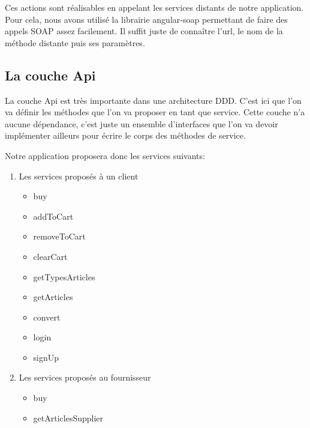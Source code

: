 \documentclass[a4paper]{article}
\begin{document}
    \bigskip
    
    Ces actions sont réalisables en appelant les services distants de notre application. Pour cela, nous avons utilisé la librairie angular-soap permettant de faire des appels SOAP assez facilement. Il suffit juste de connaître l'url, le nom de la méthode distante puis ses paramètres.
    
\subsection{La couche Api}
    La couche Api est très importante dans une architecture DDD. C'est ici que l'on va définir les méthodes que l'on va proposer en tant que service. Cette couche n'a aucune dépendance, c'est juste un ensemble d'interfaces que l'on va devoir implémenter ailleurs pour écrire le corps des méthodes de service.
    
    \bigskip
    
    Notre application proposera donc les services suivants:
    
    \bigskip
    
    \begin{enumerate}
        \item Les services proposés à un client
        \begin{itemize}
            \item buy
            \item addToCart
            \item removeToCart
            \item clearCart
            \item getTypesArticles
            \item getArticles
            \item convert
            \item login
            \item signUp
        \end{itemize}
        
        \item Les services proposés au fournisseur
        \begin{itemize}
            \item buy
            \item getArticlesSupplier
        \end{itemize}
    \end{enumerate}
    
    \bigskip
    
\end{document}
